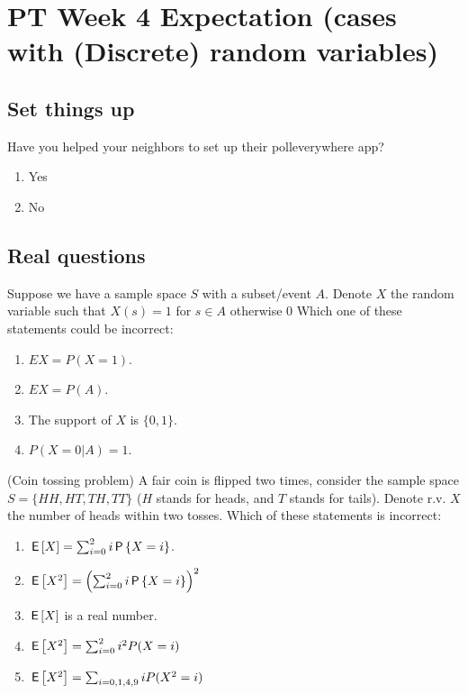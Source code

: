 \documentclass[poll_tutorial_format]{subfiles}
\begin{document}
	\maketitle
	\setcounter{section}{3}
	\section{PT Week 4 Expectation (cases with (Discrete) random variables)}
	
	\subsection{Set things up}
	\label{sec:set-things-up}
	
	
	
	\setcounter{theorem}{-1}
	
	\begin{exercise}
		Have you helped your neighbors to set up their polleverywhere app? 
		\begin{enumerate}
			\item Yes
			\item No
		\end{enumerate}
	\end{exercise}
	
	\subsection{Real questions}
	\label{sec:start-real-questions pt week 4}
	\begin{exercise}
		Suppose we have a sample space $S$ with a subset/event $A$. Denote $X$ the random variable such that $X(s)=1$ for $s\in A$ otherwise $0$ 
		Which one of these statements could be incorrect:
		\begin{enumerate}
			\item $EX=P(X=1)$.
			\item $EX=P(A)$.
			\item The support of $X$ is $\{0,1\}$.
			\item $P(X=0|A)=1$. 
		\end{enumerate}
	\end{exercise}
	
	
	\begin{exercise}
		(Coin tossing problem) A fair coin is flipped two times, consider the sample space $S=\{HH, HT, TH, TT\}$ ($H$ stands for heads, and $T$ stands for tails). Denote r.v. $X$ the number of heads within two tosses.
		Which of these statements is incorrect: 
		\begin{enumerate}
			\item $\,\mathsf{E}\left[X\right]=\sum_{i=0}^2 i\,\mathsf{P}\left\{X=i\right\}$.
			\item $\,\mathsf{E}\left[X^2\right]=\left(\sum_{i=0}^2 i\,\mathsf{P}\left\{X=i\right\} \right)^2$ 
			\item $\,\mathsf{E}\left[X\right]$ is a real number.
			\item $\,\mathsf{E}\left[X^2\right]=\sum_{i=0}^2 i^2P(X=i)$
			\item $\,\mathsf{E}\left[X^2\right]=\sum_{i=0,1,4,9} iP(X^2=i)$
		\end{enumerate}
	\end{exercise}
	
\end{document}
